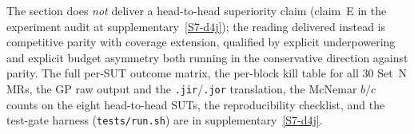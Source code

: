 The section does \emph{not} deliver a head-to-head superiority claim
(claim~E in the experiment audit at supplementary~\ref{S7-d4j}); the
reading delivered instead is competitive parity with coverage
extension, qualified by explicit underpowering and explicit budget
asymmetry both running in the conservative direction against parity.
The full per-SUT outcome matrix, the per-block kill table for all 30
Set~N MRs, the GP raw output and the \texttt{.jir}/\texttt{.jor}
translation, the McNemar $b/c$ counts on the eight head-to-head SUTs,
the reproducibility checklist, and the test-gate harness
(\texttt{tests/run.sh}) are in supplementary~\ref{S7-d4j}.
